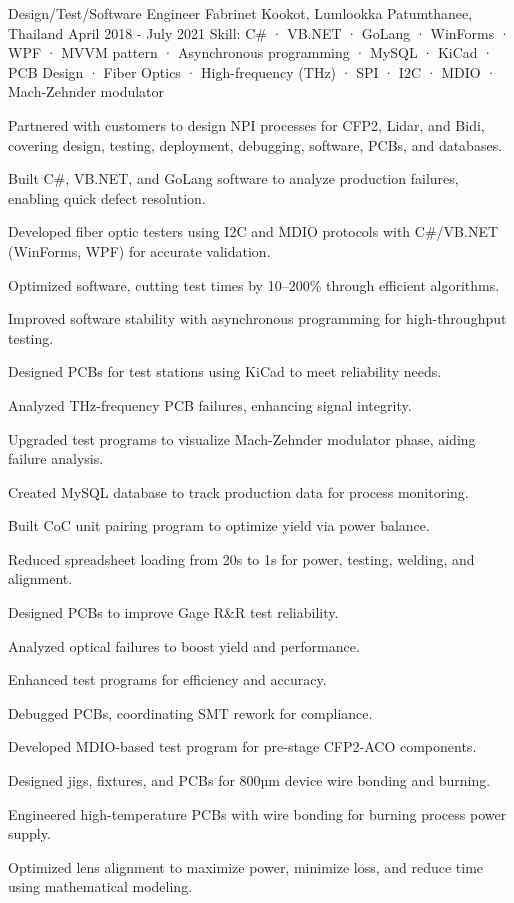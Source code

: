 \begin{cventries}
  \cventry
    {Design/Test/Software Engineer} %
    {Fabrinet} %
    {Kookot, Lumlookka Patumthanee, Thailand} %
    {April 2018 - July 2021} %
    {Skill: C\# · VB.NET · GoLang · WinForms · WPF · MVVM pattern · Asynchronous programming · MySQL · KiCad · PCB Design · Fiber Optics · High-frequency (THz) · SPI · I2C · MDIO · Mach-Zehnder modulator} %
    {
      \begin{cvitems} %
        \item {Partnered with customers to design NPI processes for CFP2, Lidar, and Bidi, covering design, testing, deployment, debugging, software, PCBs, and databases.}
        \item {Built C\#, VB.NET, and GoLang software to analyze production failures, enabling quick defect resolution.}
        \item {Developed fiber optic testers using I2C and MDIO protocols with C\#/VB.NET (WinForms, WPF) for accurate validation.}
        \item {Optimized software, cutting test times by 10–200\% through efficient algorithms.}
        \item {Improved software stability with asynchronous programming for high-throughput testing.}
        \item {Designed PCBs for test stations using KiCad to meet reliability needs.}
        \item {Analyzed THz-frequency PCB failures, enhancing signal integrity.}
        \item {Upgraded test programs to visualize Mach-Zehnder modulator phase, aiding failure analysis.}
        \item {Created MySQL database to track production data for process monitoring.}
        \item {Built CoC unit pairing program to optimize yield via power balance.}
        \item {Reduced spreadsheet loading from 20s to 1s for power, testing, welding, and alignment.}
        \item {Designed PCBs to improve Gage R\&R test reliability.}
        \item {Analyzed optical failures to boost yield and performance.}
        \item {Enhanced test programs for efficiency and accuracy.}
        \item {Debugged PCBs, coordinating SMT rework for compliance.}
        \item {Developed MDIO-based test program for pre-stage CFP2-ACO components.}
        \item {Designed jigs, fixtures, and PCBs for 800µm device wire bonding and burning.}
        \item {Engineered high-temperature PCBs with wire bonding for burning process power supply.}
        \item {Optimized lens alignment to maximize power, minimize loss, and reduce time using mathematical modeling.}
      \end{cvitems}
    }


\end{cventries}
